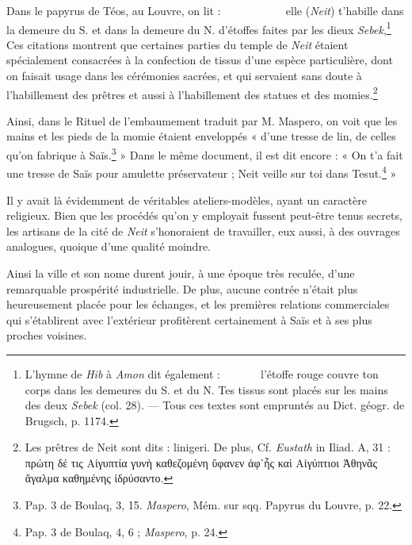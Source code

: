 \documentclass[a4paper, 11pt, oneside]{article}
\newcommand*\hieroAAAC{}
\newcommand*\hieroAAAG{}
\newcommand*\hieroAAAQ{}
\newcommand*\hieroAAAW{\raisebox{0.5ex}{}}
\newcommand*\hieroAAAX{}
\newcommand*\hieroAABR{}
\newcommand*\hieroAACM{}
\newcommand*\hieroAACN{\raisebox{1ex}{}}
\newcommand*\hieroAACS{}
\newcommand*\hieroAAEF{}
\newcommand*\hieroAAEK{}
\newcommand*\hieroAAEZ{}
\newcommand*\hieroAAFD{}
\newcommand*\hieroAAFZ{\raisebox{0.5ex}{}}
\newcommand*\hieroAAGC{}
\newcommand*\hieroAAGD{}
\newcommand*\hieroAAGE{}
\newcommand*\hieroAAGF{}
\newcommand*\hieroAAGG{}
\newcommand*\hieroAAGH{}
\newcommand*\hieroAAGI{}
\newcommand*\hieroAAGJ{}
\newcommand*\hieroAAGK{}
\newcommand*\hieroAAGL{}
\newcommand*\hieroAAGM{}
\newcommand*\hieroAAGN{}
\newcommand*\hieroAAGO{}
\newcommand*\hieroAAGP{\raisebox{0.3ex}{}}
\newcommand*\hieroAAGQ{}
\newcommand*\hieroAAGR{}
\newcommand*\hieroAAGS{}
\newcommand*\hieroAAGT{}
\begin{document}
Dans le papyrus de Téos, au Louvre, on lit : $\hieroAACS\:\hieroAAGC\:\hieroAAAG\allowbreak\:\hieroAABR\:\hieroAAFZ\:\hieroAACS\allowbreak\:\hieroAAGD\:\hieroAABR\:\hieroAAAX\allowbreak\:\hieroAAAQ\:\hieroAAAC\:\hieroAAGE\allowbreak\:\hieroAAAW\:\hieroAAGF\:\hieroAAGG\allowbreak\:\hieroAABR\:\hieroAAGH\:\hieroAACN\:\hieroAACS\allowbreak\:\hieroAAFD\:\hieroAAGI\:\hieroAAEK\allowbreak\:\hieroAAEK\:\hieroAAEF$ elle (\emph{Neit}) t'habille dans la demeure du S. et dans la demeure du N. d'étoffes faites par les dieux \emph{Sebek},\footnote{L'hymne de \emph{Hib} à \emph{Amon} dit également : $\hieroAAGJ\:\hieroAAGK\:\hieroAACM\allowbreak\:\hieroAAEZ\:\hieroAAGL\:\hieroAAGM\allowbreak\:\hieroAAAX\:\hieroAAGN\:\hieroAAGO\:\hieroAAGP\allowbreak\:\hieroAAGQ\:\hieroAAGR\allowbreak\:\hieroAAGS\:\hieroAAGT$ l'étoffe rouge couvre ton corps dans les demeures du S. et du N. Tes tissus sont placés sur les mains des deux \emph{Sebek} (col. 28). --- Tous ces textes sont empruntés au Dict. géogr. de Brugsch, p. 1174.} Ces citations montrent que certaines parties du temple de \emph{Neit} étaient spécialement consacrées à la confection de tissus d'une espèce particulière, dont on faisait usage dans les cérémonies sacrées, et qui servaient sans doute à l'habillement des prêtres et aussi à l'habillement des statues et des momies.\footnote{Les prêtres de Neit sont dits : linigeri. De plus, Cf. \emph{Eustath} in Iliad. A, 31 : πρώτη δέ τις Αἰγυπτία γυνὴ καθεζομένη ὕφανεν ἀφ᾽ἧς καὶ Αἰγύπτιοι Ἀθηνᾶς ἄγαλμα καθημένης ἱδρύσαντο.}

Ainsi, dans le Rituel de l'embaumement traduit par M. Maspero, on voit que les mains et les pieds de la momie étaient enveloppés « d'une tresse de lin, de celles qu'on fabrique à Saïs.\footnote{Pap. 3 de Boulaq, 3, 15. \emph{Maspero}, Mém. sur sqq. Papyrus du Louvre, p. 22.} » Dans le même document, il est dit encore : « On t'a fait une tresse de Saïs pour amulette préservateur ; Neit veille sur toi dans Tesut.\footnote{Pap. 3 de Boulaq, 4, 6 ; \emph{Maspero}, p. 24.} »

Il y avait là évidemment de véritables ateliers-modèles, ayant un caractère religieux. Bien que les procédés qu'on y employait fussent peut-être tenus secrets, les artisans de la cité de \emph{Neit} s'honoraient de travailler, eux aussi, à des ouvrages analogues, quoique d'une qualité moindre.

Ainsi la ville et son nome durent jouir, à une époque très reculée, d'une remarquable prospérité industrielle. De plus, aucune contrée n'était plus heureusement placée pour les échanges, et les premières relations commerciales qui s'établirent avec l'extérieur profitèrent certainement à Saïs et à ses plus proches voisines.
\end{document}
